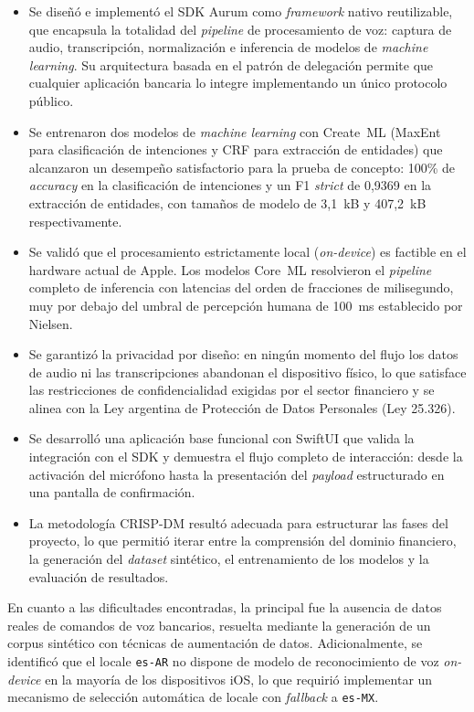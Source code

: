 \begin{itemize}
\item Se diseñó e implementó el SDK Aurum como \textit{framework} nativo reutilizable, que encapsula la totalidad del \textit{pipeline} de procesamiento de voz: captura de audio, transcripción, normalización e inferencia de modelos de \textit{machine learning}. Su arquitectura basada en el patrón de delegación permite que cualquier aplicación bancaria lo integre implementando un único protocolo público.

\item Se entrenaron dos modelos de \textit{machine learning} con Create~ML (MaxEnt para clasificación de intenciones y CRF para extracción de entidades) que alcanzaron un desempeño satisfactorio para la prueba de concepto: 100\% de \textit{accuracy} en la clasificación de intenciones y un F1 \textit{strict} de 0,9369 en la extracción de entidades, con tamaños de modelo de 3,1~kB y 407,2~kB respectivamente.

\item Se validó que el procesamiento estrictamente local (\textit{on-device}) es factible en el hardware actual de Apple. Los modelos Core~ML resolvieron el \textit{pipeline} completo de inferencia con latencias del orden de fracciones de milisegundo, muy por debajo del umbral de percepción humana de 100~ms establecido por Nielsen.

\item Se garantizó la privacidad por diseño: en ningún momento del flujo los datos de audio ni las transcripciones abandonan el dispositivo físico, lo que satisface las restricciones de confidencialidad exigidas por el sector financiero y se alinea con la Ley argentina de Protección de Datos Personales (Ley 25.326).

\item Se desarrolló una aplicación base funcional con SwiftUI que valida la integración con el SDK y demuestra el flujo completo de interacción: desde la activación del micrófono hasta la presentación del \textit{payload} estructurado en una pantalla de confirmación.

\item La metodología CRISP-DM resultó adecuada para estructurar las fases del proyecto, lo que permitió iterar entre la comprensión del dominio financiero, la generación del \textit{dataset} sintético, el entrenamiento de los modelos y la evaluación de resultados.
\end{itemize}

En cuanto a las dificultades encontradas, la principal fue la ausencia de datos reales de comandos de voz bancarios, resuelta mediante la generación de un corpus sintético con técnicas de aumentación de datos. Adicionalmente, se identificó que el locale \texttt{es-AR} no dispone de modelo de reconocimiento de voz \textit{on-device} en la mayoría de los dispositivos iOS, lo que requirió implementar un mecanismo de selección automática de locale con \textit{fallback} a \texttt{es-MX}.

